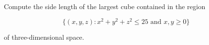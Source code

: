 Compute the side length of the largest cube contained in the region

\[ \{(x, y, z) : x^2+y^2+z^2 \le 25 \text{ and } x, y \ge 0 \} \]

of three-dimensional space.
